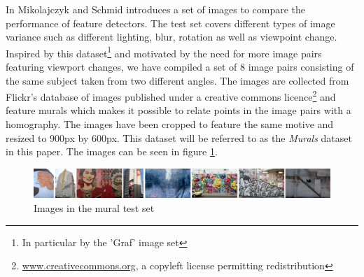\documentclass[12pt,journal]{IEEEtran}
\begin{document}
In \cite{mikolajczyk2005performance} Mikolajczyk and Schmid introduces a 
set of images to compare the performance of feature detectors. The test 
set covers different types of image variance such as different lighting, 
blur, rotation as well as viewpoint change. Inspired by this 
dataset\footnote{In particular by the 'Graf' image set} and motivated by 
the need for more image pairs featuring viewport changes, we have 
compiled a set of $8$ image pairs consisting of the same subject taken 
from two different angles. The images are collected from Flickr's 
database of images published under a creative commons 
licence\footnote{\href{http://creativecommons.org/}{www.creativecommons.org}, 
a copyleft license permitting redistribution} and feature murals which 
makes it possible to relate points in the image pairs with a homography.  
The images have been cropped to feature the same motive and resized to 
$900$px by $600$px. This dataset will be referred to as the 
\emph{Murals} dataset in this paper. The images can be seen in figure 
\ref{fig:murals}.

\begin{figure}
	\centering
	\includegraphics[width=\textwidth]{images/murals}
	\caption{Images in the mural test set}
	\label{fig:murals}
\end{figure}


\end{document}
